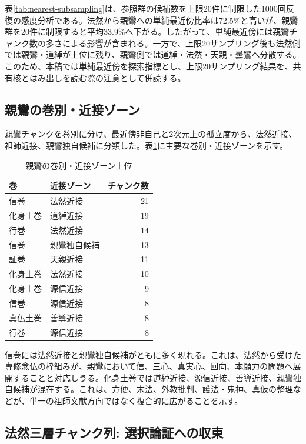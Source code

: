 \documentclass[uplatex,dvipdfmx,11pt,a4paper]{jsarticle}
\begin{document}
表\ref{tab:nearest-subsampling}は、参照群の候補数を上限20件に制限した1000回反復の感度分析である。法然から親鸞への単純最近傍比率は72.5\%と高いが、親鸞群を20件に制限すると平均33.9\%へ下がる。したがって、単純最近傍には親鸞チャンク数の多さによる影響が含まれる。一方で、上限20サンプリング後も法然側では親鸞・道綽が上位に残り、親鸞側では道綽・法然・天親・曇鸞へ分散する。このため、本稿では単純最近傍を探索指標とし、上限20サンプリング結果を、共有核とはみ出しを読む際の注意として併読する。

\subsection{親鸞の巻別・近接ゾーン}

親鸞チャンクを巻別に分け、最近傍非自己と2次元上の孤立度から、法然近接、祖師近接、親鸞独自候補に分類した。表\ref{tab:shinran-volume-affinity}に主要な巻別・近接ゾーンを示す。

\begin{table}[H]
\centering
\small
\caption{親鸞の巻別・近接ゾーン上位}
\label{tab:shinran-volume-affinity}
\begin{tabular}{@{}llr@{}}
\toprule
巻 & 近接ゾーン & チャンク数 \\
\midrule
信巻 & 法然近接 & 21 \\
化身土巻 & 道綽近接 & 19 \\
行巻 & 法然近接 & 14 \\
信巻 & 親鸞独自候補 & 13 \\
証巻 & 天親近接 & 11 \\
化身土巻 & 法然近接 & 10 \\
化身土巻 & 源信近接 & 9 \\
信巻 & 源信近接 & 8 \\
真仏土巻 & 善導近接 & 8 \\
行巻 & 源信近接 & 8 \\
\bottomrule
\end{tabular}
\end{table}

信巻には法然近接と親鸞独自候補がともに多く現れる。これは、法然から受けた専修念仏の枠組みが、親鸞において信、三心、真実心、回向、本願力の問題へ展開することと対応しうる。化身土巻では道綽近接、源信近接、善導近接、親鸞独自候補が混在する。これは、方便、末法、外教批判、護法・鬼神、真仮の整理などが、単一の祖師文献方向ではなく複合的に広がることを示す。

\subsection{法然三層チャンク列: 選択論証への収束}
\end{document}
